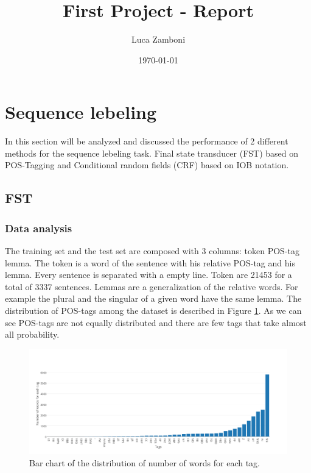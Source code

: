 \documentclass[a4paper,8pt,oneside]{article}
\author{Luca Zamboni}
\title{\vspace{-4em} \LARGE First Project - Report}
\date{\today}
\begin{document}




\newpage
\section{Sequence lebeling}

	In this section will be analyzed and discussed the performance of 2 different methods for the sequence lebeling task. Final state transducer (FST) based on POS-Tagging and Conditional random fields (CRF) based on IOB notation.

	\subsection{FST}
		\subsubsection{Data analysis}
			The training set and the test set are composed with 3 columns: token POS-tag lemma.
			The token is a word of the sentence with his relative POS-tag and his lemma. Every sentence is separated with a empty line. Token are 21453 for a total of 3337 sentences. Lemmas are a generalization of the relative words. For example the plural and the singular of a given word have the same lemma. The distribution of POS-tags among the dataset is described in Figure \ref{tag-dist}. As we can see POS-tags are not equally distributed and there are few tags that take almost all probability.
			\begin{figure}[h!]
			  \centering
			    \includegraphics[width=1.0\textwidth]{img/barcharttag}
			  \caption{Bar chart of the distribution of number of words for each tag.}
			  \label{tag-dist}
			\end{figure}
\end{document}
